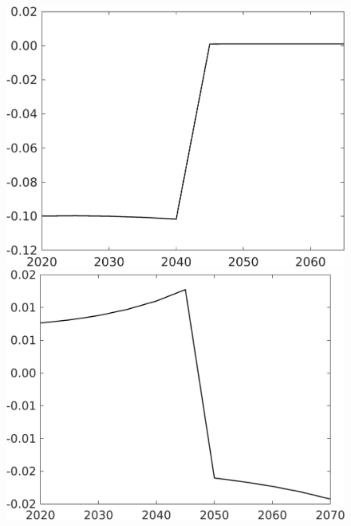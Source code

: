\begin{figure}[h!!!]
\begin{minipage}[]{0.32\textwidth}
	\end{minipage}
	\begin{minipage}[]{0.32\textwidth}
		\includegraphics[width=1\textwidth]{../../codding_model/own_basedOnFried/optimalPol_010922_revision/figures/all_13Sept22_Tplus30/gAn_OPT_COMPtaulPer_regime4_spillover0_knspil1_noskill1_sep0_xgrowth0_PV1_etaa0.79.png}
	\end{minipage}
	\begin{minipage}[]{0.32\textwidth}
		\includegraphics[width=1\textwidth]{../../codding_model/own_basedOnFried/optimalPol_010922_revision/figures/all_13Sept22_Tplus30/SWF_OPT_COMPtaulPer_regime4_spillover0_knspil1_noskill1_sep0_xgrowth0_PV1_etaa0.79.png}

\end{minipage}
\end{figure}
